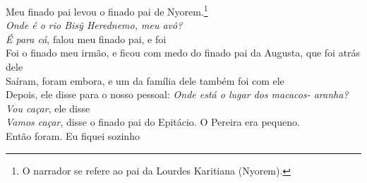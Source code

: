 \bigskip

\begin{linenumbers}\begingroup\raggedright
 
\noindent   Meu finado pai levou o finado pai de Nyorem.\footnote{O narrador se refere ao pai da Lourdes Karitiana (Nyorem).}\\
  \emph{Onde é o rio \emph{Bisỹ Herednemo}, meu avô?}\\
  \emph{É para cá}, falou meu finado pai, e foi\\
  Foi o finado meu irmão, e ficou com medo do finado pai da Augusta, que foi atrás dele\\
  Saíram, foram embora, e um da família dele também foi com ele\\
  Depois, ele disse para o nosso pessoal: \emph{Onde está o lugar dos macacos- aranha?}\\
  \emph{Vou caçar}, ele disse\\
  \emph{Vamos caçar}, disse o finado pai do Epitácio. O Pereira era pequeno.\\
  Então foram. Eu fiquei sozinho
 
\end{linenumbers}\endgroup

\bigskip

